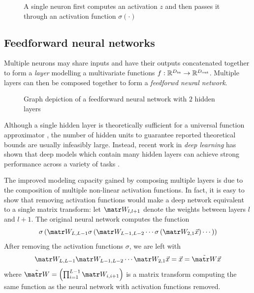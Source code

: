 \begin{figure}[tb]
    \centering
    
    \caption{A single neuron first computes an activation $z$ and then passes it through an activation function $\sigma(\cdot)$}
    \label{fig:nn-single}
\end{figure}

\subsection{Feedforward neural networks}

Multiple neurons may share inputs and have their outputs concatenated together
to form a \emph{layer} modelling a multivariate functions $f :
\mathbb{R}^{D_\text{in}} \to \mathbb{R}^{D_\text{out}}$. Multiple layers can then
be composed together to form a \emph{feedforwd neural network}.

\begin{figure}[tb]
    \centering
    
    \caption{Graph depiction of a feedforward neural network with $2$ hidden layers}
    \label{fig:nn-ffw}
\end{figure}

Although a single hidden layer is theoretically sufficient for a universal
function approximator \citep{Cybenko1993}, the number of hidden units to
guarantee reported theoretical bounds are usually infeasibly large. Instead,
recent work in \emph{deep learning} has shown that deep models which contain
many hidden layers can achieve strong performance across a variety of
tasks \citep{Bengio2011}.

The improved modeling capacity gained by composing multiple layers is due to
the composition of multiple non-linear activation functions.
In fact, it is easy to show that removing activation functions would make
a deep network equivalent to a single matrix transform: let $\W_{l,l+1}$
denote the weights between layers $l$ and $l+1$. The original neural network
computes the function
\begin{equation}
    \sigma\left(
        \W_{L,L-1} \sigma \left(
            \W_{L-1,L-2}\cdots \sigma \left(
                \W_{2,1} \x
            \right) \cdots
        \right)
    \right)
\end{equation}
After removing the activation functions $\sigma$, we are left with
\begin{equation}
    \W_{L,L-1} \W_{L-1,L-2}\cdots \W_{2,1} \x
    = \x
    = \tilde{\W} \x
\end{equation}
where $\tilde{\W} = \left(\prod_{i=1}^{L-1} \W_{i,i+1} \right)$
is a matrix transform computing the same function as the neural network with
activation functions removed.

